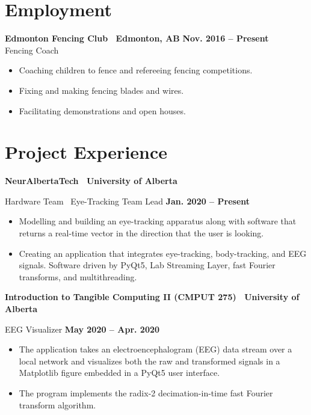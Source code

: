 \documentclass{article}
\begin{document}
\section*{\textcolor{my_red}{Employment}}
    \textbf{Edmonton Fencing Club \textbar\ Edmonton, AB} \hfill \textbf{Nov. 2016 -- Present}\\
    Fencing  Coach \vspace{-0.75em}
    \begin{itemize}
        \item Coaching children to fence and refereeing fencing competitions.
        \item Fixing and making fencing blades and wires.
        \item Facilitating demonstrations and open houses.
    \end{itemize}


\section*{\textcolor{my_red}{Project Experience}}
    \textbf{NeurAlbertaTech \textbar\ University of Alberta}

    Hardware Team \textbar\ Eye-Tracking Team Lead \hfill \textbf{Jan. 2020 -- Present}
    \begin{itemize}
        \item Modelling and building an eye-tracking apparatus along with software that returns a real-time vector in the direction that the user is looking.
        \item Creating an application that integrates eye-tracking, body-tracking, and EEG signals. Software driven by PyQt5, Lab Streaming Layer, fast Fourier transforms, and multithreading.
    \end{itemize}

    \textbf{Introduction to Tangible Computing II (CMPUT 275) \textbar\ University of Alberta}

    EEG Visualizer \hfill \textbf{May 2020 -- Apr. 2020}
    \begin{itemize}
        \item The application takes an electroencephalogram (EEG) data stream over a local network and visualizes both the raw and transformed signals in a Matplotlib figure embedded in a PyQt5 user interface.
        \item The program implements the radix-2 decimation-in-time fast Fourier transform algorithm.
    \end{itemize}
\end{document}
